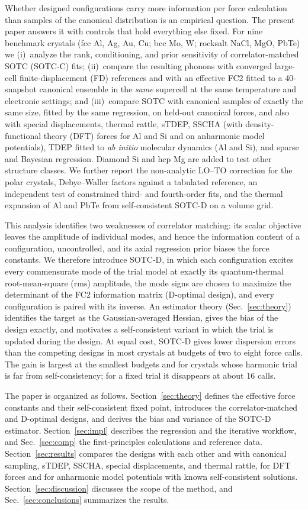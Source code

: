 \documentclass[aip,jap,reprint,amsmath,amssymb,floatfix]{revtex4-2}
\begin{document}
Whether designed configurations carry more information per force calculation
than samples of the canonical distribution is an empirical question. The present paper
answers it with controls that hold everything else fixed. For nine benchmark
crystals (fcc Al, Ag, Au, Cu; bcc Mo, W; rocksalt NaCl, MgO, PbTe) we
(i)~analyze the rank, conditioning, and prior sensitivity of correlator-matched
SOTC (SOTC-C) fits; (ii)~compare the resulting phonons with converged large-cell
finite-displacement (FD) references and with an effective FC2 fitted to a
40-snapshot canonical ensemble in the \emph{same} supercell at the same
temperature and electronic settings; and (iii)~compare SOTC with canonical
samples of exactly the same size, fitted by the same regression, on
held-out canonical forces, and also with special displacements, thermal
rattle, sTDEP, SSCHA (with density-functional theory (DFT) forces for Al and Si and on anharmonic model
potentials), TDEP fitted to \textit{ab initio}
molecular dynamics (Al and Si), and sparse and Bayesian regression. Diamond Si and hcp
Mg are added to test other structure classes. We further report the
non-analytic LO--TO correction for the polar crystals, Debye--Waller factors
against a tabulated reference, an independent test of constrained third-
and fourth-order fits, and the thermal expansion of Al and PbTe from self-consistent
SOTC-D on a volume grid.

This analysis identifies two weaknesses of correlator matching: its scalar
objective leaves the amplitude of individual modes, and hence the
information content of a configuration, uncontrolled, and its axial
regression prior biases the force constants. We therefore introduce SOTC-D, in
which each configuration excites every commensurate mode of the trial model at
exactly its quantum-thermal root-mean-square (rms) amplitude, the mode signs are chosen to
maximize the determinant of the FC2 information matrix (D-optimal design), and
every configuration is paired with its inverse. An estimator theory
(Sec.~\ref{sec:theory}) identifies the target as the Gaussian-averaged
Hessian, gives the bias of the design exactly, and motivates a
self-consistent variant in which the trial is updated during the design.
At equal cost, SOTC-D gives lower dispersion errors than the competing
designs in most crystals at budgets of two to eight force calls. The gain is
largest at the smallest budgets and for crystals whose harmonic trial is far
from self-consistency; for a fixed trial it disappears at about 16 calls.

The paper is organized as follows. Section~\ref{sec:theory} defines the
effective force constants and their self-consistent fixed point, introduces
the correlator-matched and D-optimal designs, and derives the bias and
variance of the SOTC-D estimator. Section~\ref{sec:impl} describes the
regression and the iterative workflow, and Sec.~\ref{sec:comp} the
first-principles calculations and reference data. Section~\ref{sec:results}
compares the designs with each other and with canonical sampling, sTDEP,
SSCHA, special displacements, and thermal rattle, for DFT forces and for
anharmonic model potentials with known self-consistent solutions.
Section~\ref{sec:discussion} discusses the scope of the method, and
Sec.~\ref{sec:conclusions} summarizes the results.
\end{document}
